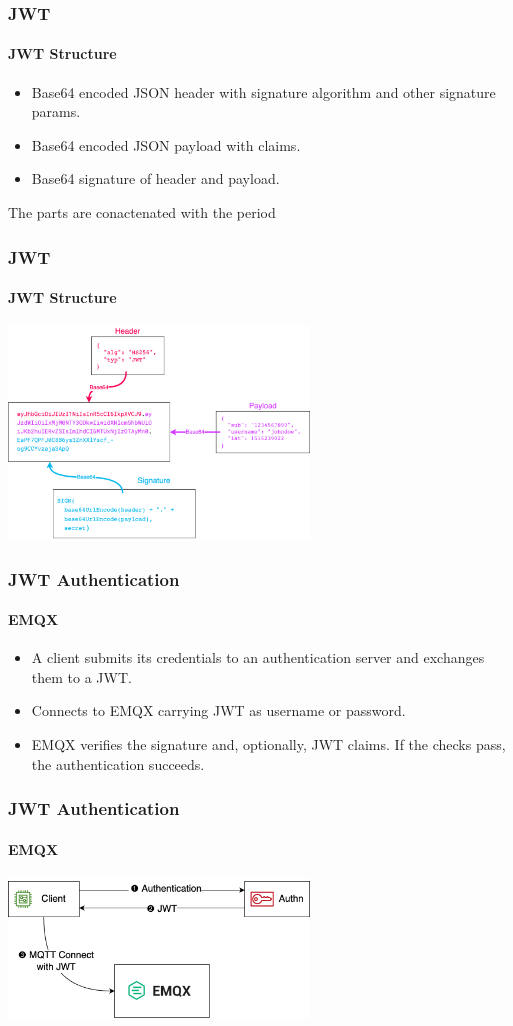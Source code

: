 \documentclass{beamer}
\begin{document}
\begin{frame}
    \frametitle{JWT}
    \framesubtitle{JWT Structure}

    \begin{itemize}
        \item Base64 encoded JSON header with signature algorithm and other signature params.
        \item Base64 encoded JSON payload with claims.
        \item Base64 signature of header and payload.
    \end{itemize}
    The parts are conactenated with the period
\end{frame}


\begin{frame}
    \frametitle{JWT}
    \framesubtitle{JWT Structure}

    \begin{center}
        \includegraphics[width=8cm, keepaspectratio]{images/jwt-structure.png}
    \end{center}
\end{frame}

\begin{frame}
    \frametitle{JWT Authentication}
    \framesubtitle{EMQX}

    \begin{itemize}
        \item A client submits its credentials to an authentication server and exchanges them to a JWT.
        \item Connects to EMQX carrying JWT as username or password.
        \item EMQX verifies the signature and, optionally, JWT claims. If the checks pass, the authentication succeeds.
    \end{itemize}
\end{frame}

\begin{frame}
    \frametitle{JWT Authentication}
    \framesubtitle{EMQX}

    \begin{center}
        \includegraphics[width=8cm, keepaspectratio]{images/jwt-authn.png}
    \end{center}
\end{frame}
\end{document}
